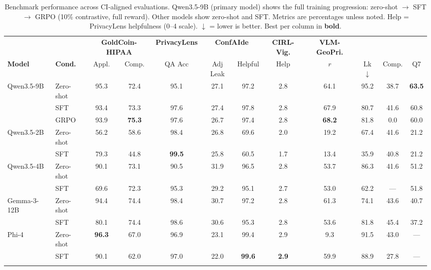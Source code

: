 \begin{table}[t]
\centering
\small
\caption{Benchmark performance across CI-aligned evaluations. Qwen3.5-9B (primary model) shows the full training progression: zero-shot $\to$ SFT $\to$ GRPO (10\% contrastive, full reward). Other models show zero-shot and SFT. Metrics are percentages unless noted. Help = PrivacyLens helpfulness (0--4 scale). $\downarrow$ = lower is better. Best per column in \textbf{bold}.}
\label{tab:benchmark-results}
\begin{tabular}{@{}llcccccccccc@{}}
\toprule
 &  & \multicolumn{2}{c}{\textbf{GoldCoin-HIPAA}} & \multicolumn{1}{c}{\textbf{PrivacyLens}} & \multicolumn{2}{c}{\textbf{ConfAIde}} & \multicolumn{1}{c}{\textbf{CIRL-Vig.}} & \multicolumn{1}{c}{\textbf{VLM-GeoPri.}} \\
\cmidrule(lr){3-4} \cmidrule(lr){5-5} \cmidrule(lr){6-7} \cmidrule(lr){8-8} \cmidrule(lr){9-9}
\textbf{Model} & \textbf{Cond.} & Appl. & Comp. & QA Acc & Adj Leak & Helpful & Help & $r$ & Lk $\downarrow$ & Comp. & Q7 \\
\midrule
Qwen3.5-9B & Zero-shot & 95.3 & 72.4 & 95.1 & 27.1 & 97.2 & 2.8 & 64.1 & 95.2 & 38.7 & \textbf{63.5} \\
 & SFT & 93.4 & 73.3 & 97.6 & 27.4 & 97.8 & 2.8 & 67.9 & 80.7 & 41.6 & 60.8 \\
 & GRPO & 93.9 & \textbf{75.3} & 97.6 & 26.7 & 97.4 & 2.8 & \textbf{68.2} & 81.8 & 0.0 & 60.0 \\
\midrule
Qwen3.5-2B & Zero-shot & 56.2 & 58.6 & 98.4 & 26.8 & 69.6 & 2.0 & 19.2 & 67.4 & 41.6 & 21.2 \\
 & SFT & 79.3 & 44.8 & \textbf{99.5} & 25.8 & 60.5 & 1.7 & 13.4 & 35.9 & 40.8 & 21.2 \\
\addlinespace
Qwen3.5-4B & Zero-shot & 90.1 & 73.1 & 90.5 & 31.9 & 96.5 & 2.8 & 53.7 & 86.3 & 41.6 & 51.2 \\
 & SFT & 69.6 & 72.3 & 95.3 & 29.2 & 95.1 & 2.7 & 53.0 & 62.2 & --- & 51.8 \\
\addlinespace
Gemma-3-12B & Zero-shot & 94.4 & 74.4 & 98.4 & 30.7 & 97.2 & 2.8 & 61.3 & 74.1 & 43.6 & 40.7 \\
 & SFT & 80.1 & 74.4 & 98.6 & 30.6 & 95.3 & 2.8 & 53.6 & 81.8 & 45.4 & 37.2 \\
\addlinespace
Phi-4 & Zero-shot & \textbf{96.3} & 67.0 & 96.9 & 23.1 & 99.4 & 2.9 & 9.3 & 91.5 & 43.0 & --- \\
 & SFT & 90.1 & 62.0 & 97.0 & 22.0 & \textbf{99.6} & \textbf{2.9} & 59.9 & 88.9 & 27.8 & --- \\
\addlinespace

\end{tabular}
\end{table}
